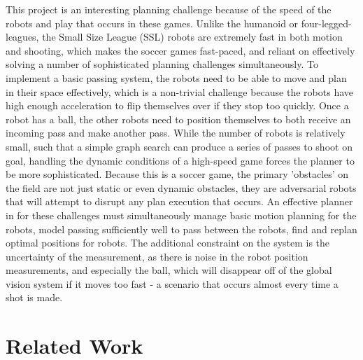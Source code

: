 \documentclass[a4paper, 10pt, conference]{ieeeconf}      %
\begin{document}
This project is an interesting planning challenge because of the speed of the robots and play that occurs in these games. Unlike the humanoid or four-legged-leagues, the Small Size League (SSL) robots are extremely fast in both motion and shooting, which makes the soccer games fast-paced, and reliant on effectively solving a number of sophisticated planning challenges simultaneously. To implement a basic passing system, the robots need to be able to move and plan in their space effectively, which is a non-trivial challenge because the robots have high enough acceleration to flip themselves over if they stop too quickly. Once a robot has a ball, the other robots need to position themselves to both receive an incoming pass and make another pass. While the number of robots is relatively small, such that a simple graph search can produce a series of passes to shoot on goal, handling the dynamic conditions of a high-speed game forces the planner to be more sophisticated. Because this is a soccer game, the primary 'obstacles' on the field are not just static or even dynamic obstacles, they are adversarial robots that will attempt to disrupt any plan execution that occurs. An effective planner in for these challenges must simultaneously manage basic motion planning for the robots, model passing sufficiently well to pass between the robots, find and replan optimal positions for robots. The additional constraint on the system is the uncertainty of the measurement, as there is noise in the robot position measurements, and especially the ball, which will disappear off of the global vision system if it moves too fast - a scenario that occurs almost every time a shot is made. 

\section{Related Work}
\end{document}

